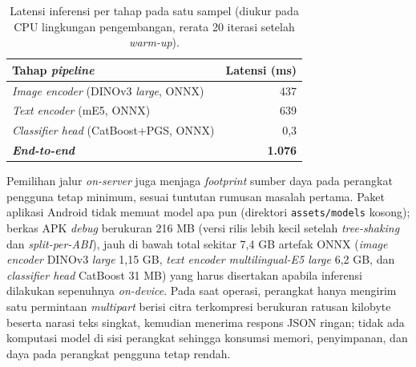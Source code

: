\begin{table}[htbp]
\centering
\caption{Latensi inferensi per tahap pada satu sampel (diukur pada CPU lingkungan pengembangan, rerata 20 iterasi setelah \textit{warm-up}).}
\label{tab:latensi}
\begin{tabular}{l r}
\toprule
\textbf{Tahap \textit{pipeline}} & \textbf{Latensi (ms)} \\
\midrule
\textit{Image encoder} (DINOv3 \textit{large}, ONNX) & 437 \\
\textit{Text encoder} (mE5, ONNX) & 639 \\
\textit{Classifier head} (CatBoost+PGS, ONNX) & 0,3 \\
\midrule
\textbf{\textit{End-to-end}} & \textbf{1.076} \\
\bottomrule
\end{tabular}
\end{table}

Pemilihan jalur \textit{on-server} juga menjaga \textit{footprint} sumber daya pada perangkat pengguna tetap minimum, sesuai tuntutan rumusan masalah pertama. Paket aplikasi Android tidak memuat model apa pun (direktori \texttt{assets/models} kosong); berkas APK \textit{debug} berukuran 216 MB (versi rilis lebih kecil setelah \textit{tree-shaking} dan \textit{split-per-ABI}), jauh di bawah total sekitar 7,4 GB artefak ONNX (\textit{image encoder} DINOv3 \textit{large} 1,15 GB, \textit{text encoder multilingual-E5 large} 6,2 GB, dan \textit{classifier head} CatBoost 31 MB) yang harus disertakan apabila inferensi dilakukan sepenuhnya \textit{on-device}. Pada saat operasi, perangkat hanya mengirim satu permintaan \textit{multipart} berisi citra terkompresi berukuran ratusan kilobyte beserta narasi teks singkat, kemudian menerima respons JSON ringan; tidak ada komputasi model di sisi perangkat sehingga konsumsi memori, penyimpanan, dan daya pada perangkat pengguna tetap rendah.
